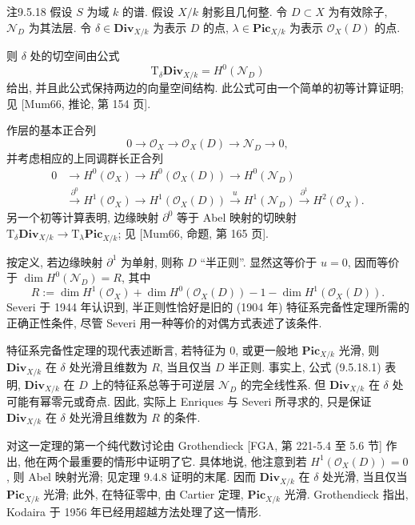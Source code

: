 \begin{origstatement}{注}{9.5.18}\label{ch09s05:rem9.5.18}
假设 $S$ 为域 $k$ 的谱. 假设 $X/k$ 射影且几何整. 令 $D\subset X$ 为有效除子, $\mathcal N_D$ 为其法层. 令 $\delta\in\mathbf{Div}_{X/k}$ 为表示 $D$ 的点, $\lambda\in\mathbf{Pic}_{X/k}$ 为表示 $\mathcal O_X(D)$ 的点.

则 $\delta$ 处的切空间由公式
\begin{equation}\tag{9.5.18.1}\label{ch09s05:eq9.5.18.1}
 \mathrm T_\delta\mathbf{Div}_{X/k}=H^0(\mathcal N_D)
\end{equation}
给出, 并且此公式保持两边的向量空间结构. 此公式可由一个简单的初等计算证明; 见 [Mum66, 推论, 第 154 页].

作层的基本正合列
\[
 0\longrightarrow\mathcal O_X\longrightarrow\mathcal O_X(D)\longrightarrow\mathcal N_D\longrightarrow0,
\]
并考虑相应的上同调群长正合列
\[
\begin{aligned}
0&\longrightarrow H^0(\mathcal O_X)\longrightarrow H^0(\mathcal O_X(D))\longrightarrow H^0(\mathcal N_D)\\
 &\xrightarrow{\partial^0}H^1(\mathcal O_X)\longrightarrow H^1(\mathcal O_X(D))
 \xrightarrow{u}H^1(\mathcal N_D)\xrightarrow{\partial^1}H^2(\mathcal O_X).
\end{aligned}
\]
另一个初等计算表明, 边缘映射 $\partial^0$ 等于 Abel 映射的切映射 $\mathrm T_\delta\mathbf{Div}_{X/k}\to\mathrm T_\lambda\mathbf{Pic}_{X/k}$; 见 [Mum66, 命题, 第 165 页].

按定义, 若边缘映射 $\partial^1$ 为单射, 则称 $D$ “半正则”. 显然这等价于 $u=0$, 因而等价于 $\dim H^0(\mathcal N_D)=R$, 其中
\[
 R:=\dim H^1(\mathcal O_X)+\dim H^0(\mathcal O_X(D))-1-\dim H^1(\mathcal O_X(D)).
\]
Severi 于 1944 年认识到, 半正则性恰好是旧的 (1904 年) 特征系完备性定理所需的正确正性条件, 尽管 Severi 用一种等价的对偶方式表述了该条件.

特征系完备性定理的现代表述断言, 若特征为 $0$, 或更一般地 $\mathbf{Pic}_{X/k}$ 光滑, 则 $\mathbf{Div}_{X/k}$ 在 $\delta$ 处光滑且维数为 $R$, 当且仅当 $D$ 半正则. 事实上, 公式 (9.5.18.1) 表明, $\mathbf{Div}_{X/k}$ 在 $D$ 上的特征系总等于可逆层 $\mathcal N_D$ 的完全线性系. 但 $\mathbf{Div}_{X/k}$ 在 $\delta$ 处可能有幂零元或奇点. 因此, 实际上 Enriques 与 Severi 所寻求的, 只是保证 $\mathbf{Div}_{X/k}$ 在 $\delta$ 处光滑且维数为 $R$ 的条件.


对这一定理的第一个纯代数讨论由 Grothendieck [FGA, 第 221-5.4 至 5.6 节] 作出, 他在两个最重要的情形中证明了它. 具体地说, 他注意到若 $H^1(\mathcal O_X(D))=0$, 则 Abel 映射光滑; 见定理 9.4.8 证明的末尾. 因而 $\mathbf{Div}_{X/k}$ 在 $\delta$ 处光滑, 当且仅当 $\mathbf{Pic}_{X/k}$ 光滑; 此外, 在特征零中, 由 Cartier 定理, $\mathbf{Pic}_{X/k}$ 光滑. Grothendieck 指出, Kodaira 于 1956 年已经用超越方法处理了这一情形.


\end{origstatement}
